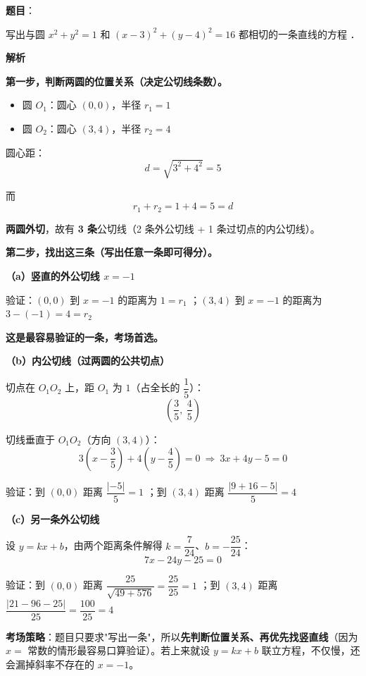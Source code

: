 \begin{answer}

\textbf{题目}：

写出与圆 $x^{2}+y^{2}=1$ 和 $(x-3)^{2}+(y-4)^{2}=16$ 都相切的一条直线的方程 \gkblank{}．

\textbf{解析}

\textbf{第一步，判断两圆的位置关系（决定公切线条数）。}

\begin{itemize}
\item 圆 $O_1$：圆心 $(0,0)$，半径 $r_1=1$
\item 圆 $O_2$：圆心 $(3,4)$，半径 $r_2=4$
\end{itemize}

圆心距：
\nopagebreak[4]
\[d=\sqrt{3^{2}+4^{2}}=5\]

而
\nopagebreak[4]
\[r_1+r_2=1+4=5=d\]

\textbf{两圆外切}，故有 \textbf{3 条}公切线（2 条外公切线 + 1 条过切点的内公切线）。

\textbf{第二步，找出这三条（写出任意一条即可得分）。}

\textbf{（a）竖直的外公切线 $x=-1$}

验证：$(0,0)$ 到 $x=-1$ 的距离为 $1=r_1$ ；$(3,4)$ 到 $x=-1$ 的距离为 $3-(-1)=4=r_2$ 

\textbf{这是最容易验证的一条，考场首选。}

\textbf{（b）内公切线（过两圆的公共切点）}

切点在 $O_1O_2$ 上，距 $O_1$ 为 $1$（占全长的 $\dfrac15$）：
\nopagebreak[4]
\[\left(\frac35,\ \frac45\right)\]

切线垂直于 $O_1O_2$（方向 $(3,4)$）：
\nopagebreak[4]
\[3\left(x-\frac35\right)+4\left(y-\frac45\right)=0\ \Longrightarrow\ 3x+4y-5=0\]

验证：到 $(0,0)$ 距离 $\dfrac{|-5|}5=1$ ；到 $(3,4)$ 距离 $\dfrac{|9+16-5|}5=4$ 

\textbf{（c）另一条外公切线}

设 $y=kx+b$，由两个距离条件解得 $k=\dfrac7{24}$、$b=-\dfrac{25}{24}$：
\nopagebreak[4]
\[7x-24y-25=0\]

验证：到 $(0,0)$ 距离 $\dfrac{25}{\sqrt{49+576}}=\dfrac{25}{25}=1$ ；到 $(3,4)$ 距离 $\dfrac{|21-96-25|}{25}=\dfrac{100}{25}=4$ 

\begin{gktip}
\textbf{考场策略}：题目只要求"写出一条"，所以\textbf{先判断位置关系、再优先找竖直线}（因为 $x=$ 常数的情形最容易口算验证）。若上来就设 $y=kx+b$ 联立方程，不仅慢，还会漏掉斜率不存在的 $x=-1$。
\end{gktip}


\par\medskip

\end{answer}
